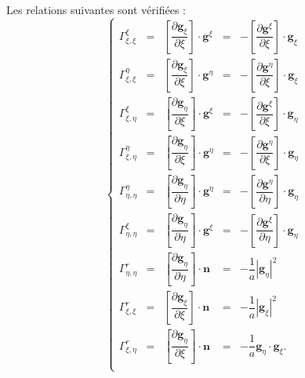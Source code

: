 \begin{proposition}
Les relations suivantes sont vérifiées :
\begin{equation}
\left\lbrace
\begin{array}{rcccl}
\Gamma_{\xi,\xi}^{\xi} & = & \left[ \dfrac{\partial \mathbf{g}_{\xi}}{\partial \xi} \right] \cdot \mathbf{g}^{\xi} & = & - \left[ \dfrac{\partial \mathbf{g}^{\xi}}{\partial \xi} \right] \cdot \mathbf{g}_ {\xi}\\

\Gamma_{\xi,\xi}^{\eta} & = & \left[ \dfrac{\partial \mathbf{g}_{\xi}}{\partial \xi} \right] \cdot \mathbf{g}^{\eta} & = & - \left[ \dfrac{\partial \mathbf{g}^{\eta}}{\partial \xi} \right] \cdot \mathbf{g}_ {\xi}\\

\Gamma_{\xi,\eta}^{\xi} & = & \left[ \dfrac{\partial \mathbf{g}_{\eta}}{\partial \xi} \right] \cdot \mathbf{g}^{\xi} & = & - \left[ \dfrac{\partial \mathbf{g}^{\xi}}{\partial \xi} \right] \cdot \mathbf{g}_ {\eta}\\

\Gamma_{\xi,\eta}^{\eta} & = & \left[ \dfrac{\partial \mathbf{g}_{\eta}}{\partial \xi} \right] \cdot \mathbf{g}^{\eta} & = & - \left[ \dfrac{\partial \mathbf{g}^{\eta}}{\partial \xi} \right] \cdot \mathbf{g}_ {\eta}\\

\Gamma_{\eta,\eta}^{\eta} & = & \left[ \dfrac{\partial \mathbf{g}_{\eta}}{\partial \eta} \right] \cdot \mathbf{g}^{\eta} & = & - \left[ \dfrac{\partial \mathbf{g}^{\eta}}{\partial \eta} \right] \cdot \mathbf{g}_ {\eta}\\

\Gamma_{\eta,\eta}^{\xi} & = & \left[ \dfrac{\partial \mathbf{g}_{\eta}}{\partial \eta} \right] \cdot \mathbf{g}^{\xi} & = & - \left[ \dfrac{\partial \mathbf{g}^{\xi}}{\partial \eta} \right] \cdot \mathbf{g}_ {\eta}\\

\Gamma_{\eta,\eta}^{r} & = & \left[ \dfrac{\partial \mathbf{g}_{\eta}}{\partial \eta} \right] \cdot \mathbf{n} & = & - \dfrac{1}{a}|\mathbf{g}_{\eta}|^2\\

\Gamma_{\xi,\xi}^{r} & = & \left[ \dfrac{\partial \mathbf{g}_{\xi}}{\partial \xi} \right] \cdot \mathbf{n} & = & - \dfrac{1}{a}|\mathbf{g}_{\xi}|^2\\

\Gamma_{\xi,\eta}^r & = & \left[ \dfrac{\partial \mathbf{g}_{\eta}}{\partial \xi} \right] \cdot \mathbf{n} & = & - \dfrac{1}{a} \mathbf{g}_{\eta} \cdot \mathbf{g}_{\xi}. \\

\end{array}
\right.
\end{equation}
\end{proposition}

